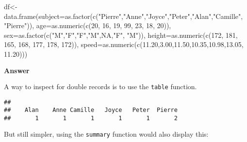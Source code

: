 \documentclass[
]{article}
\newenvironment{Shaded}{\begin{snugshade}}{\end{snugshade}}
\newcommand{\AttributeTok}[1]{\textcolor[rgb]{0.77,0.63,0.00}{#1}}
\newcommand{\ConstantTok}[1]{\textcolor[rgb]{0.00,0.00,0.00}{#1}}
\newcommand{\DecValTok}[1]{\textcolor[rgb]{0.00,0.00,0.81}{#1}}
\newcommand{\FloatTok}[1]{\textcolor[rgb]{0.00,0.00,0.81}{#1}}
\newcommand{\FunctionTok}[1]{\textcolor[rgb]{0.00,0.00,0.00}{#1}}
\newcommand{\NormalTok}[1]{#1}
\newcommand{\OtherTok}[1]{\textcolor[rgb]{0.56,0.35,0.01}{#1}}
\newcommand{\SpecialCharTok}[1]{\textcolor[rgb]{0.00,0.00,0.00}{#1}}
\newcommand{\StringTok}[1]{\textcolor[rgb]{0.31,0.60,0.02}{#1}}
\begin{document}
\begin{Shaded}
\begin{Highlighting}[]
\NormalTok{df}\OtherTok{\textless{}{-}}\FunctionTok{data.frame}\NormalTok{(}\AttributeTok{subject=}\FunctionTok{as.factor}\NormalTok{(}\FunctionTok{c}\NormalTok{(}\StringTok{"Pierre"}\NormalTok{,}\StringTok{"Anne"}\NormalTok{,}\StringTok{"Joyce"}\NormalTok{,}\StringTok{"Peter"}\NormalTok{,}\StringTok{"Alan"}\NormalTok{,}\StringTok{"Camille"}\NormalTok{, }\StringTok{"Pierre"}\NormalTok{)), }\AttributeTok{age=}\FunctionTok{as.numeric}\NormalTok{(}\FunctionTok{c}\NormalTok{(}\DecValTok{20}\NormalTok{, }\DecValTok{16}\NormalTok{, }\DecValTok{19}\NormalTok{, }\DecValTok{99}\NormalTok{, }\DecValTok{23}\NormalTok{, }\DecValTok{18}\NormalTok{, }\DecValTok{20}\NormalTok{)), }\AttributeTok{sex=}\FunctionTok{as.factor}\NormalTok{(}\FunctionTok{c}\NormalTok{(}\StringTok{"M"}\NormalTok{,}\StringTok{"F"}\NormalTok{,}\StringTok{"F"}\NormalTok{,}\StringTok{"M"}\NormalTok{,}\ConstantTok{NA}\NormalTok{,}\StringTok{"F"}\NormalTok{, }\StringTok{"M"}\NormalTok{)), }\AttributeTok{height=}\FunctionTok{as.numeric}\NormalTok{(}\FunctionTok{c}\NormalTok{(}\DecValTok{172}\NormalTok{, }\DecValTok{181}\NormalTok{, }\DecValTok{165}\NormalTok{, }\DecValTok{168}\NormalTok{, }\DecValTok{177}\NormalTok{, }\DecValTok{178}\NormalTok{, }\DecValTok{172}\NormalTok{)), }\AttributeTok{speed=}\FunctionTok{as.numeric}\NormalTok{(}\FunctionTok{c}\NormalTok{(}\FloatTok{11.20}\NormalTok{,}\FloatTok{3.00}\NormalTok{,}\FloatTok{11.50}\NormalTok{,}\FloatTok{10.35}\NormalTok{,}\FloatTok{10.98}\NormalTok{,}\FloatTok{13.05}\NormalTok{, }\FloatTok{11.20}\NormalTok{)))}
\end{Highlighting}
\end{Shaded}

\textbf{Answer}

A way to inspect for double records is to use the \texttt{table}
function.

\begin{Shaded}
\end{Shaded}

\begin{verbatim}
## 
##    Alan    Anne Camille   Joyce   Peter  Pierre 
##       1       1       1       1       1       2
\end{verbatim}

But still simpler, using the \texttt{summary} function would also
display this:
\end{document}
